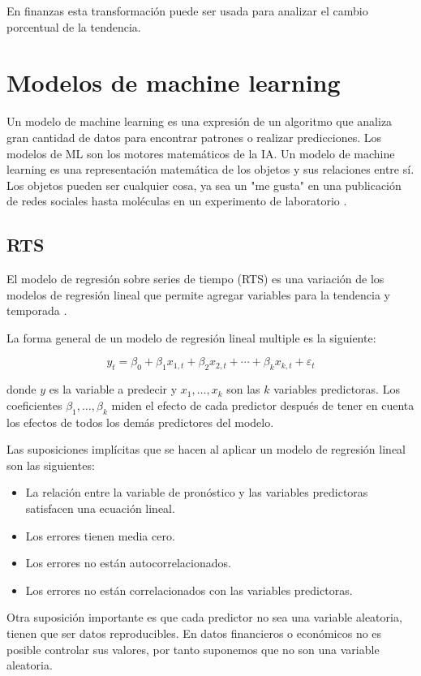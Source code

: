 En finanzas esta transformación puede ser usada para analizar el cambio porcentual de la tendencia.


\section{Modelos de machine learning}

Un modelo de machine learning es una expresión de un algoritmo que analiza gran cantidad de datos para encontrar patrones o realizar predicciones. Los modelos de ML son los motores matemáticos de la IA.
Un modelo de machine learning es una representación matemática de los objetos y sus relaciones entre sí. Los objetos pueden ser cualquier cosa, ya sea un "me gusta" en una publicación de redes sociales hasta moléculas en un experimento de laboratorio \cite{parsonsQueEsModelo2021}.

\subsection{RTS}
El modelo de regresión sobre series de tiempo (RTS) es una variación de los modelos de regresión lineal que permite agregar variables para la tendencia y temporada \cite{TslmFitLinear}. 

La forma general de un modelo de regresión lineal multiple es la siguiente:

\[
y_{t}=\beta_{0}+\beta_{1} x_{1, t}+\beta_{2} x_{2, t}+\cdots+\beta_{k} x_{k, t}+\varepsilon_{t}
\]

donde $y$ es la variable a predecir y $x_{1}, \ldots, x_{k}$ son las $k$ variables predictoras.
Los coeficientes $\beta_{1}, \ldots, \beta_{k}$ miden el efecto de cada predictor después de tener en cuenta los efectos de todos los demás predictores del modelo.

Las suposiciones implícitas que se hacen al aplicar un modelo de regresión lineal son las siguientes:

\begin{itemize}
\item La relación entre la variable de pronóstico y las variables predictoras satisfacen una ecuación lineal.
\item Los errores tienen media cero.
\item Los errores no están autocorrelacionados.
\item Los errores no están correlacionados con las variables predictoras.
\end{itemize}

Otra suposición importante es que cada predictor no sea una variable aleatoria, tienen que ser datos reproducibles. En datos financieros o económicos no es posible controlar sus valores, por tanto suponemos que no son una variable aleatoria.

